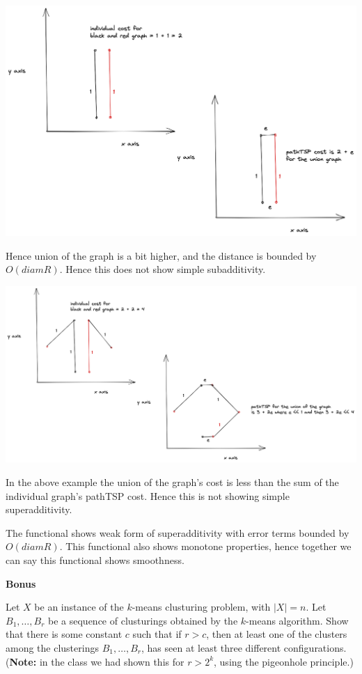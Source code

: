 \documentclass[12pt, a4paper, onecolumn]{exam}
\begin{document}
\begin{questions}
\begin{solution}
		\includegraphics*[scale = 0.27]{non-monotone.png}

		Hence union of the graph is a bit higher, and the distance is bounded by $O(diam R)$.
		Hence this does not show simple subadditivity.

		\includegraphics*[scale = 0.25]{sub.png}

		In the above example the union of the graph's cost is less than the sum of the individual graph's \textsf{pathTSP} cost.
		Hence this is not showing simple superadditivity.

		The functional shows weak form of superadditivity with error terms
		bounded by $O(diam R)$. This functional also shows monotone properties,
		hence together we can say this functional shows smoothness.
	\end{solution}
\end{questions}

\begin{center}
	{\bf Bonus}
\end{center}
\begin{questions}
	\question[5] Let $X$ be an instance of the $k$-means clusturing problem, with $|X| = n$. Let $B_1,\ldots, B_r$ be a sequence of clusturings obtained by the $k$-means algorithm. Show that there is some constant $c$ such that if $r>c$, then at least one of the clusters among the clusterings $B_1,\ldots, B_r$, has seen at least three different configurations. ({\bf Note:} in the class we had shown this for $r>2^k$, using the pigeonhole principle.)
\end{questions}
\end{document}
